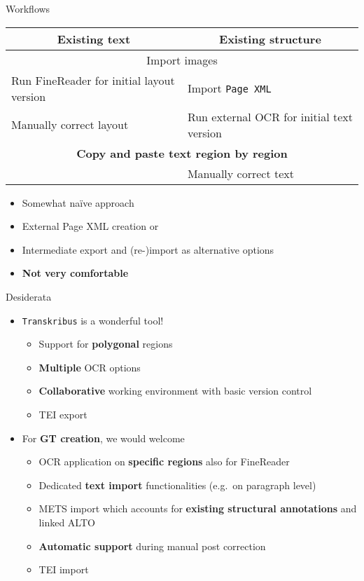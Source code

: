 \documentclass{bbawslides}
\begin{document}
\begin{bbawslide}{Workflows}
  \vspace*{2mm}%
  \centerslidestrue%
  \begin{center}
    \begin{tabular}{|l|l|}
      \hline
      \multicolumn{1}{|c|}{\textbf{Existing text}} & \multicolumn{1}{c|}{\textbf{Existing structure}} \\
      \hline
      \hline
      \multicolumn{2}{|c|}{Import images} \\
      \hline
      Run FineReader for initial layout version & Import \texttt{Page XML} \\
      \hline
      Manually correct layout & Run external OCR for initial text version \\
      \hline
      \multicolumn{2}{|c|}{\bf Copy and paste text region by region} \\
      \hline
      & Manually correct text \\
      \hline
    \end{tabular}
  \end{center}
  \begin{itemize}
    \item Somewhat na\"{i}ve approach
    \item External Page XML creation or
    \item Intermediate export and (re-)import as alternative options
    \item \textbf{Not very comfortable}
  \end{itemize}
\end{bbawslide}

\begin{bbawslide}{Desiderata}
  \vspace*{7mm}%
  \centerslidestrue%
  \begin{itemize}
    \item \texttt{Transkribus} is a wonderful tool!
    \begin{itemize}\small
      \item Support for \textbf{polygonal} regions
      \item \textbf{Multiple} OCR options
      \item \textbf{Collaborative} working environment with basic version control
      \item TEI export
    \end{itemize}
    \item For \textbf{GT creation}, we would welcome
    \begin{itemize}\small
      \item OCR application on \textbf{specific regions} also for FineReader
      \item Dedicated \textbf{text import} functionalities (e.g.~on paragraph level)
      \item METS import which accounts for \textbf{existing structural annotations} and linked ALTO
      \item \textbf{Automatic support} during manual post correction
      \item TEI import
    \end{itemize}
  \end{itemize}
\end{bbawslide}
\end{document}
